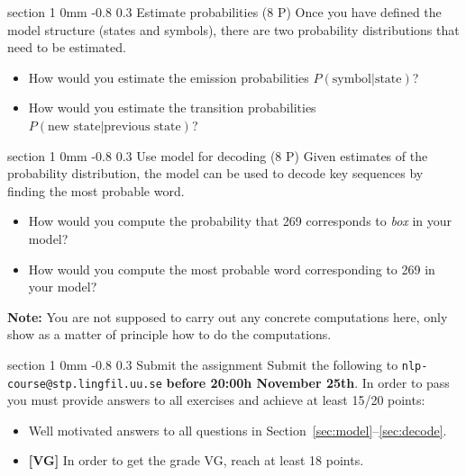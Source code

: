 \documentclass[11pt]{article}
\makeatletter
\newcommand{\newsec}[2]{\section{#1}\label{sec:#2}\noindent}
\renewcommand{\section}{\@startsection
{section}%
{1}%
{0mm}%
{-0.8\baselineskip}%
{0.3\baselineskip}%
{\bfseries\large}}%
\makeatother
\begin{document}
\newsec{Estimate probabilities (8 P)}{estimate}%
Once you have defined the model structure (states and symbols), there are two probability distributions that need to be estimated.
\begin{itemize}[noitemsep,topsep=0.2cm]
\item How would you estimate the emission probabilities $P(\mbox{symbol}|\mbox{state})$?
\item How would you estimate the transition probabilities $P(\mbox{new state}|\mbox{previous state})$?
\end{itemize}

\newsec{Use model for decoding (8 P)}{decode}%
Given estimates of the probability distribution, the model can be used to decode key sequences by finding the most probable word.
\begin{itemize}[noitemsep,topsep=0.2cm]
\item How would you compute the probability that 269 corresponds to {\em box} in your model?
\item How would you compute the most probable word corresponding to 269 in your model?
\end{itemize}
\textbf{Note:} You are not supposed to carry out any concrete computations here, only show as a matter of principle how to do the computations.

\newsec{Submit the assignment}{submit}%
Submit the following to {\tt nlp-course@stp.lingfil.uu.se} \textbf{before 20:00h November 25th}. In order to pass you must provide answers to all exercises and achieve at least 15/20 points: 
\begin{itemize}[noitemsep,topsep=0.2cm]
\item Well motivated answers to all questions in Section~\ref{sec:model}--\ref{sec:decode}.
\item \textbf{[VG]} In order to get the grade VG, reach at least 18 points.
\end{itemize}
\end{document}
